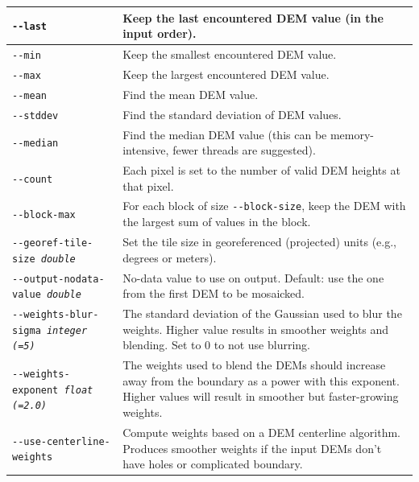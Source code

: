 \begin{longtable}{|l|p{10cm}|}
\texttt{-\/-last}
& Keep the last encountered DEM value (in the input order).
\\ \hline

\texttt{-\/-min}
& Keep the smallest encountered DEM value.
\\ \hline

\texttt{-\/-max}
& Keep the largest encountered DEM value.
\\ \hline

\texttt{-\/-mean}
& Find the mean DEM value.
\\ \hline

\texttt{-\/-stddev}
& Find the standard deviation of DEM values.
\\ \hline

\texttt{-\/-median}
& Find the median DEM value (this can be memory-intensive, fewer threads are suggested).
\\ \hline

\texttt{-\/-count}
& Each pixel is set to the number of valid DEM heights at that pixel.
\\ \hline

\texttt{-\/-block-max} & For each block of size \texttt{-\/-block-size}, keep the DEM with the largest sum of values in the block.\\ \hline

\texttt{-\/-georef-tile-size \textit{double}} &
Set the tile size in georeferenced (projected) units (e.g., degrees or meters).
\\ \hline
\texttt{-\/-output-nodata-value \textit{double}} &
No-data value to use on output. Default: use the one from the first DEM to be mosaicked.
\\ \hline

\texttt{-\/-weights-blur-sigma \textit{integer (=5)} } &
The standard deviation of the Gaussian used to blur the weights. Higher value results in smoother weights and blending. Set to 0 to not use blurring.
\\ \hline

\texttt{-\/-weights-exponent \textit{float (=2.0)} } &
The weights used to blend the DEMs should increase away from the boundary as a power with this exponent. Higher values will result in smoother but faster-growing weights.
\\ \hline

\texttt{-\/-use-centerline-weights} &
Compute weights based on a DEM centerline algorithm. Produces smoother weights if the input DEMs don't have holes or complicated boundary.
\\ \hline


\end{longtable}
